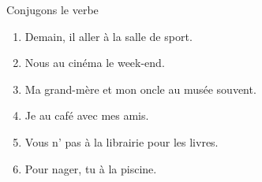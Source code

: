 \begin{frame}{Conjugons le verbe }
  \begin{enumerate}
    \item Demain, il \underline{} aller à la salle de sport.
    \item Nous \underline{} au cinéma le week-end.
    \item Ma grand-mère et mon oncle \underline{} au musée souvent.
    \item Je \underline{} au café avec mes amis.
    \item Vous n'\underline{} pas à la librairie pour les livres.
    \item Pour nager, tu \underline{} à la piscine.
  \end{enumerate}
\end{frame}